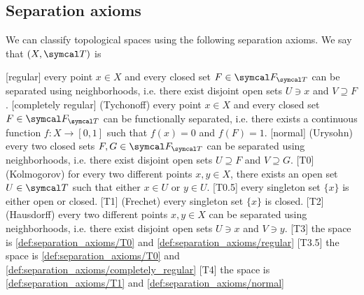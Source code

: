 \subsection{Separation axioms}\label{subsec:separation_axioms}

\begin{definition}\label{def:separation_axioms}
  We can classify topological spaces using the following separation axioms. We say that \( (X, \Cal{T}) \) is

  \begin{description}
    [regular] every point \( x \in X \) and every closed set \( F \in \Cal{F}_{\Cal{T}} \) can be separated using neighborhoods, i.e. there exist disjoint open sets \( U \ni x \) and \( V \supseteq F \).
    [completely regular] (Tychonoff) every point \( x \in X \) and every closed set \( F \in \Cal{F}_{\Cal{T}} \) can be functionally separated, i.e. there exists a continuous function \( f: X \to [0, 1] \) such that \( f(x) = 0 \) and \( f(F) = 1 \).
    [normal] (Urysohn) every two closed sets \( F, G \in \Cal{F}_{\Cal{T}} \) can be separated using neighborhoods, i.e. there exist disjoint open sets \( U \supseteq F \) and \( V \supseteq G \).
    [T0] (Kolmogorov) for every two different points \( x, y \in X \), there exists an open set \( U \in \Cal{T} \) such that either \( x \in U \) or \( y \in U \).
    [T0.5] every singleton set \( \{ x \} \) is either open or closed.
    [T1] (Frechet) every singleton set \( \{ x \} \) is closed.
    [T2] (Hausdorff) every two different points \( x, y \in X \) can be separated using neighborhoods, i.e. there exist disjoint open sets \( U \ni x \) and \( V \ni y \).
    [T3] the space is \ref{def:separation_axioms/T0} and \ref{def:separation_axioms/regular}
    [T3.5] the space is \ref{def:separation_axioms/T0} and \ref{def:separation_axioms/completely_regular}
    [T4] the space is \ref{def:separation_axioms/T1} and \ref{def:separation_axioms/normal}
  \end{description}
\end{definition}

